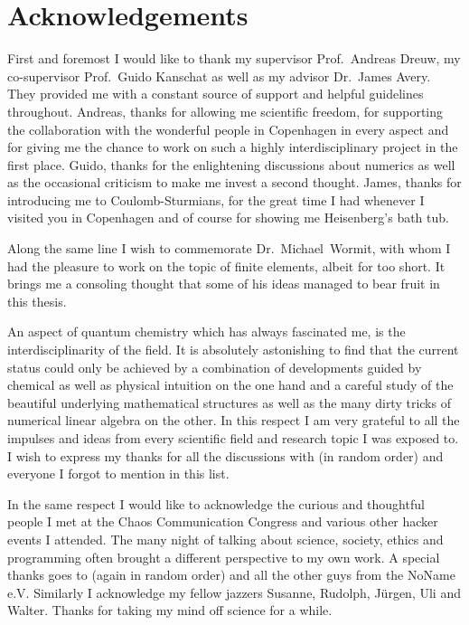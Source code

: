 \chapter*{Acknowledgements} 
{}

First and foremost I would like to thank
my supervisor Prof.~Andreas Dreuw,
my co-supervisor Prof.~Guido Kanschat
as well as my advisor Dr.~James Avery.
They provided me with a constant source of support
and helpful guidelines throughout.
Andreas, thanks for allowing me scientific freedom,
for supporting the collaboration with the wonderful people in Copenhagen in every aspect
and for giving me the chance to work on such
a highly interdisciplinary project in the first place.
Guido, thanks for the enlightening discussions about numerics
as well as the occasional criticism to make me invest a second thought.
James, thanks for introducing me to Coulomb-Sturmians,
for the great time I had whenever I visited you in Copenhagen
and of course for showing me Heisenberg's bath tub.

Along the same line I wish to commemorate Dr.~Michael~Wormit,
with whom I had the pleasure to work on the topic of finite elements,
albeit for too short.
It brings me a consoling thought that some of his
ideas managed to bear fruit in this thesis.


An aspect of quantum chemistry
which has always fascinated me,
is the interdisciplinarity of the field.
It is absolutely astonishing
to find that the current status could only be achieved
by a combination of developments guided by chemical as well as physical intuition
on the one hand
and a careful study of the beautiful underlying mathematical structures
as well as the many dirty tricks of numerical linear algebra on the other.
In this respect I am very grateful
to all the impulses and ideas from
every scientific field and research topic I was exposed to.
I wish to express my thanks for all the discussions with
(in random order)
%
and everyone I forgot to mention in this list.


In the same respect I would like to acknowledge the curious and thoughtful
people I met at the Chaos Communication Congress
and various other hacker events I attended.
The many night of talking
about science, society, ethics and programming often brought a
different perspective to my own work.
A special thanks goes to 
(again in random order)
%
and all the other guys from the NoName e.V.
Similarly I acknowledge my fellow jazzers
Susanne, Rudolph, Jürgen, Uli and Walter.
Thanks for taking my mind off science for a while.


